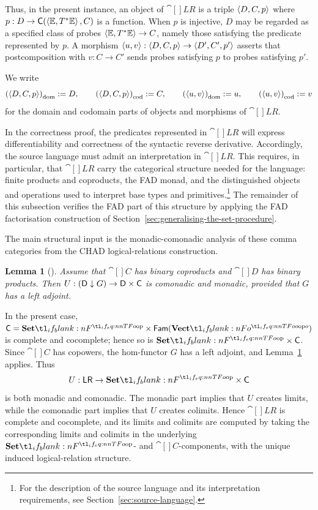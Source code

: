 \documentclass[11pt,a4paper]{article}
\newtheorem{lemma}[theorem]{Lemma}
\theoremstyle{definition}
\theoremstyle{remark}
\providecommand{\Fam}[1]{\mathsf{Fam}(#1)}
\providecommand{\TE}{T^{\ast}\E}
\providecommand{\E}{\mathbb{E}}
\providecommand{\dompt}[1]{\left(#1\right)_{\mathrm{dom}}}
\providecommand{\codpt}[1]{\left(#1\right)_{\mathrm{cod}}}
\begin{document}
Thus, in the present instance, an object of \( \cat[]{LR} \) is a triple
\(
\left\langle D,C,p\right\rangle
\)
where
\(
p:D\to\fn[n]{\cat[]{C}}{\tuple{\E,\TE},C}
\)
is a function. When \(p\) is injective, \(D\) may be regarded as a specified
class of probes \( \tuple{\E,\TE}\to C \), namely those satisfying the
predicate represented by \(p\). A morphism
\(
\left\langle u,v\right\rangle:\left\langle D,C,p\right\rangle\to\left\langle D',C',p'\right\rangle
\)
asserts that postcomposition with \(v:C\to C'\) sends probes satisfying
\(p\) to probes satisfying \(p'\).

We write
\[
\dompt{\tuple{D,C,p}}:=D,
\qquad
\codpt{\tuple{D,C,p}}:=C,
\qquad
\dompt{\tuple{u,v}}:=u,
\qquad
\codpt{\tuple{u,v}}:=v
\]
for the domain and codomain parts of objects and morphisms of \( \cat[]{LR} \).

In the correctness proof, the predicates represented in \( \cat[]{LR} \) will
express differentiability and correctness of the syntactic reverse derivative.
Accordingly, the source language must admit an interpretation in
\( \cat[]{LR} \). This requires, in particular, that \( \cat[]{LR} \) carry
the categorical structure needed for the language: finite products and
coproducts, the FAD monad, and the distinguished objects and operations used
to interpret base types and primitives.\footnote{For the description of the
	source language and its interpretation requirements, see
	Section~\ref{sec:source-language}.} The remainder of this subsection verifies
the FAD part of this structure by applying the FAD factorisation construction
of Section~\ref{sec:generalising-the-set-procedure}.

The main structural input is the monadic-comonadic analysis of these comma
categories from the CHAD logical-relations construction.

\begin{lemma}[{\cite[Corollary~99]{lucatellinunesCHADExpressiveTotal2023}}]
	\label{lem:monadicity-and-comonadicity-of-u}
	Assume that \( \cat[]{C} \) has binary coproducts and \( \cat[]{D} \) has
	binary products. Then
	\( U:\commacat{\cat[]{D}}{G}\to\cat[]{D}\times\cat[]{C} \) is comonadic and
	monadic, provided that \(G\) has a left adjoint.
\end{lemma}


In the present case, \( \cat[]{C}=\Set\times\Fam{\Vect[o]} \) is complete and
cocomplete; hence so is \( \Set\times\cat[]{C} \). Since \( \cat[]{C} \) has
copowers, the hom-functor \(G\) has a left adjoint, and
Lemma~\ref{lem:monadicity-and-comonadicity-of-u} applies. Thus
\[
U:\cat[]{LR}\to\Set\times\cat[]{C}
\]
is both monadic and comonadic. The monadic part implies that \(U\) creates
limits, while the comonadic part implies that \(U\) creates colimits. Hence
\( \cat[]{LR} \) is complete and cocomplete, and its limits and colimits are
computed by taking the corresponding limits and colimits in the underlying
\( \Set \)- and \( \cat[]{C} \)-components, with the unique induced
logical-relation structure.
\end{document}
